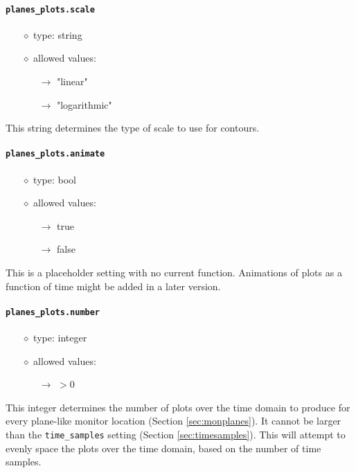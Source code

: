 \documentclass[]{article}
\def\code#1{\texttt{#1}}
\begin{document}
\paragraph{\code{planes\_plots.scale}}
\begin{itemize}
    \item[$\diamond$] type: string 
    \item[$\diamond$] allowed values:
    \begin{itemize}
        \item[$\rightarrow$] "linear"
        \item[$\rightarrow$] "logarithmic"
    \end{itemize}
\end{itemize}
This string determines the type of scale to use for contours.

\paragraph{\code{planes\_plots.animate}}
\begin{itemize}
    \item[$\diamond$] type: bool 
    \item[$\diamond$] allowed values:
    \begin{itemize}
        \item[$\rightarrow$] true
        \item[$\rightarrow$] false
    \end{itemize}
\end{itemize}
This is a placeholder setting with no current function. Animations of plots as
a function of time might be added in a later version.

\paragraph{\code{planes\_plots.number}}
\begin{itemize}
    \item[$\diamond$] type: integer 
    \item[$\diamond$] allowed values:
    \begin{itemize}
        \item[$\rightarrow$] $>0$
    \end{itemize}
\end{itemize}
This integer determines the number of plots over the time domain to produce for
every plane-like monitor location (Section \ref{sec:monplanes}). It cannot be
larger than the \code{time\_samples} setting (Section \ref{sec:timesamples}).
This will attempt to evenly space the plots over the time domain, based on the
number of time samples.
\end{document}
